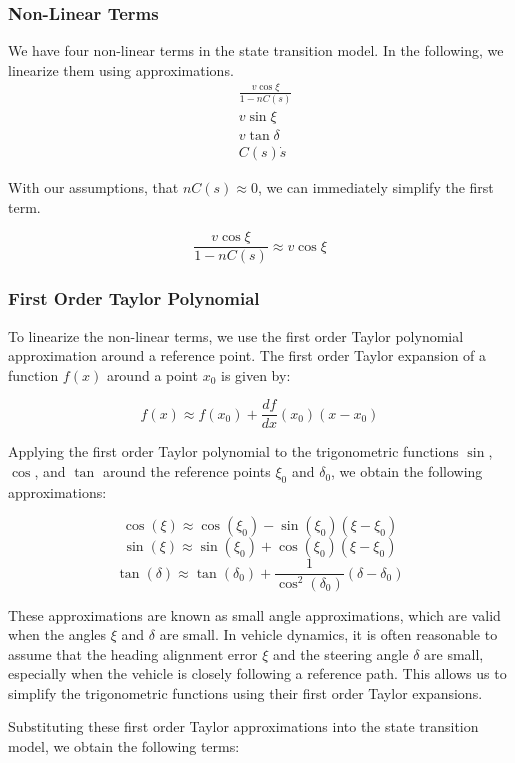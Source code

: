 \subsubsection{Non-Linear Terms}

We have four non-linear terms in the state transition model.
In the following, we linearize them using approximations.
\begin{align}
	 & \frac{v \cos\xi}{1 - nC(s)} \\
	 & v \sin\xi                   \\
	 & v \tan\delta                \\
	 & C(s)\dot{s}
\end{align}

With our assumptions, that $nC(s)\approx 0$, we can immediately simplify the first term.

\[
	\frac{v \cos\xi}{1 - nC(s)} \approx v \cos\xi
\]

\subsubsection{First Order Taylor Polynomial}

To linearize the non-linear terms, we use the first order Taylor polynomial approximation around a reference point.
The first order Taylor expansion of a function \(f(x)\) around a point \(x_0\) is given by:

\[ f(x) \approx f(x_0) +
	\frac{df}{dx} (x_0) (x - x_0) \]

Applying the first order Taylor polynomial to the trigonometric functions $\sin$, $\cos$, and
$\tan$ around the reference points $\xi_0$ and $\delta_0$, we obtain the following approximations:

\[ \cos(\xi) \approx
	\cos(\xi_0) - \sin(\xi_0) (\xi - \xi_0) \] \[ \sin(\xi) \approx \sin(\xi_0) + \cos(\xi_0) (\xi - \xi_0) \] \[ \tan(\delta) \approx \tan(\delta_0) +
	\frac{1}{\cos^2(\delta_0)} (\delta - \delta_0) \]

These approximations are known as small angle approximations, which are valid
when the angles $\xi$ and $\delta$ are small.
In vehicle dynamics, it is often reasonable to assume that the heading alignment error $\xi$ and the steering angle $\delta$ are small, especially
when the vehicle is closely following a reference path.
This allows us to simplify the trigonometric functions using their first order Taylor expansions.

Substituting these first order Taylor approximations into the state transition model, we obtain the following terms:

